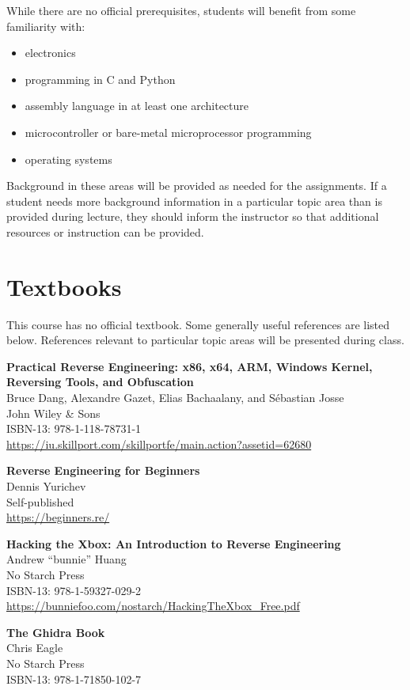 \documentclass[12pt,twoside]{article}
\renewcommand\_{\textunderscore\allowbreak}
\begin{document}
While there are no official prerequisites, students will benefit from some
familiarity with:
\begin{itemize}
\item electronics
\item programming in C and Python
\item assembly language in at least one architecture
\item microcontroller or bare-metal microprocessor programming
\item operating systems
\end{itemize}
Background in these areas will be provided as needed for the assignments. If a
student needs more background information in a particular topic area than is
provided during lecture,  they should inform the instructor so that additional
resources or instruction can be provided.

\section{Textbooks}

This course has no official textbook. Some generally useful references are
listed below. References relevant to particular topic areas will be presented
during class.

{\bf Practical Reverse Engineering: x86, x64, ARM, Windows Kernel, Reversing
Tools, and Obfuscation}\\
Bruce Dang, Alexandre Gazet, Elias Bachaalany, and S\'{e}bastian Josse\\
John Wiley \& Sons\\
ISBN-13: 978-1-118-78731-1\\
\url{https://iu.skillport.com/skillportfe/main.action?assetid=62680}

{\bf Reverse Engineering for Beginners}\\
Dennis Yurichev\\
Self-published\\
\url{https://beginners.re/}

{\bf Hacking the Xbox: An Introduction to Reverse Engineering}\\
Andrew ``bunnie'' Huang\\
No Starch Press\\
ISBN-13: 978-1-59327-029-2\\
\url{https://bunniefoo.com/nostarch/HackingTheXbox_Free.pdf}

{\bf The Ghidra Book}\\
Chris Eagle\\
No Starch Press\\
ISBN-13: 978-1-71850-102-7
\end{document}

